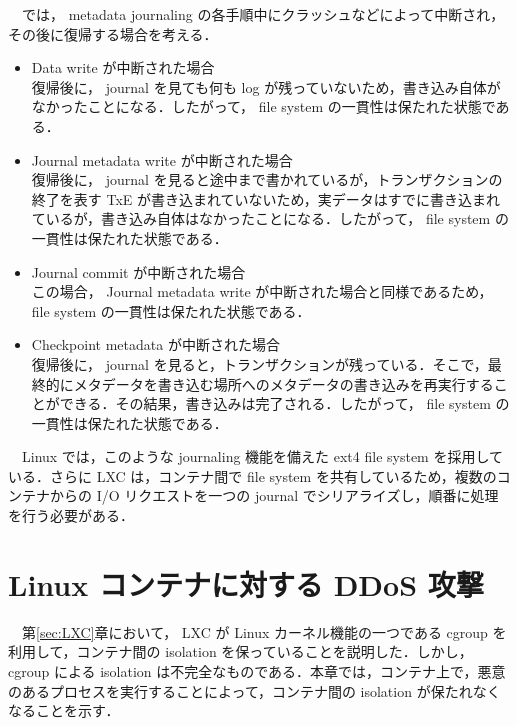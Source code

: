 \documentclass[graduation-thesis]{jsarticle}
\begin{document}
　では， metadata journaling の各手順中にクラッシュなどによって中断され，その後に復帰する場合を考える．\\
\begin{itemize}
	\item{Data write が中断された場合}\\
	復帰後に， journal を見ても何も log が残っていないため，書き込み自体がなかったことになる．したがって， file system の一貫性は保たれた状態である．\\
	\item{Journal metadata write が中断された場合}\\
	復帰後に， journal を見ると途中まで書かれているが，トランザクションの終了を表す TxE が書き込まれていないため，実データはすでに書き込まれているが，書き込み自体はなかったことになる．したがって， file system の一貫性は保たれた状態である．\\
	\item{Journal commit が中断された場合}\\
	この場合， Journal metadata write が中断された場合と同様であるため， file system の一貫性は保たれた状態である．\\
	\item{Checkpoint metadata が中断された場合}\\
	復帰後に， journal を見ると，トランザクションが残っている．そこで，最終的にメタデータを書き込む場所へのメタデータの書き込みを再実行することができる．その結果，書き込みは完了される．したがって， file system の一貫性は保たれた状態である．\\
\end{itemize}
　Linux では，このような journaling 機能を備えた ext4 file system を採用している．さらに LXC は，コンテナ間で file system を共有しているため，複数のコンテナからの I/O リクエストを一つの journal でシリアライズし，順番に処理を行う必要がある．

\clearpage
\section{Linux コンテナに対する DDoS 攻撃}
\label{sec:DDoS}
　第\ref{sec:LXC}章において， LXC が Linux カーネル機能の一つである cgroup を利用して，コンテナ間の isolation を保っていることを説明した．しかし， cgroup による isolation は不完全なものである．本章では，コンテナ上で，悪意のあるプロセスを実行することによって，コンテナ間の isolation が保たれなくなることを示す．\\
\end{document}
